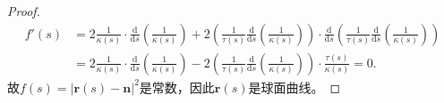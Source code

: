 \documentclass[../../main.tex]{subfiles}%
\begin{document}
\begin{proof}
\begin{align*}
f'(s)&=2\frac{1}{\kappa(s)}\cdot \frac{\mathrm{d}}{\mathrm{d}s}\left( \frac{1}{\kappa(s)} \right) +2\left( \frac{1}{\tau(s)}\frac{\mathrm{d}}{\mathrm{d}s}\left( \frac{1}{\kappa(s)} \right) \right) \cdot \frac{\mathrm{d}}{\mathrm{d}s}\left( \frac{1}{\tau(s)}\frac{\mathrm{d}}{\mathrm{d}s}\left( \frac{1}{\kappa(s)} \right) \right) \\
&=2\frac{1}{\kappa(s)}\cdot \frac{\mathrm{d}}{\mathrm{d}s}\left( \frac{1}{\kappa(s)} \right) -2\left( \frac{1}{\tau(s)}\frac{\mathrm{d}}{\mathrm{d}s}\left( \frac{1}{\kappa(s)} \right) \right) \cdot \frac{\tau(s)}{\kappa(s)}=0.
\end{align*}
故$f(s)=\left| \bm{r}(s)-\bm{n} \right|^2$是常数，因此$\bm{r}(s)$是球面曲线。

\end{proof}
\end{document}
